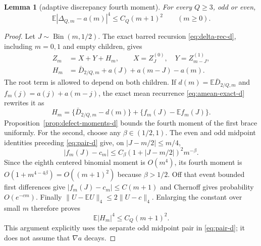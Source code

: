 \documentclass[11pt]{article}
\numberwithin{equation}{section}
\newtheorem{lemma}[theorem]{Lemma}
\newcommand{\1}{\mathbf 1}\newcommand{\F}{\mathcal F}\newcommand{\D}{\mathcal D}
\begin{document}
\begin{lemma}[adaptive discrepancy fourth moment]\label{lem:i5-fourth}
For every $Q\ge3$, odd or even,
\begin{equation}
 \mathbb E|\Delta_{Q,m}-a(m)|^4\le C_Q(m+1)^2\qquad(m\ge0).       \tag{5.2}\label{eq:i5-delta-fourth}
\end{equation}
\end{lemma}
\begin{proof}
Let $J\sim\operatorname {Bin}(m,1/2)$.  The exact barred recursion
\eqref{eq:delta-rec-d}, including $m=0,1$ and empty children, gives
\begin{align}
 Z_m&=X+Y+H_m,\qquad X=Z_J^{(0)},\quad Y=Z_{m-J}^{(1)},             \tag{5.3}\label{eq:i5-centered-rec}\\
 H_m&=\bar D_{2/Q,m}+a(J)+a(m-J)-a(m).                              \tag{5.4}\label{eq:i5-H}
\end{align}
The root term is allowed to depend on both children.  If
$d(m)=\mathbb E\bar D_{2/Q,m}$ and $f_m(j)=a(j)+a(m-j)$, the exact mean
recurrence \eqref{eq:amean-exact-d} rewrites it as
\[
 H_m=\{\bar D_{2/Q,m}-d(m)\}+\{f_m(J)-\mathbb Ef_m(J)\}.           \tag{5.5}\label{eq:i5-Hcenter}
\]
Proposition~\ref{prop:defect-moments-d} bounds the fourth moment of the first
brace uniformly.  For the second, choose any $\beta\in(1/2,1)$.  The even
and odd midpoint identities preceding \eqref{eq:pair-d} give, on
$|J-m/2|\le m/4$,
\[
 |f_m(J)-c_m|\le C_\beta(1+|J-m/2|)^2m^{-\beta}.
\]
Since the eighth centered binomial moment is $O(m^4)$, its fourth moment is
$O(1+m^{4-4\beta})=O((m+1)^2)$ because $\beta>1/2$.  Off that event bounded first differences give
$|f_m(J)-c_m|\le C(m+1)$ and Chernoff gives probability $O(e^{-cm})$.
Finally $\|U-\mathbb EU\|_4\le2\|U-c\|_4$.  Enlarging the constant over
small $m$ therefore proves
\begin{equation}\mathbb E|H_m|^4\le C_Q(m+1)^2.                    \tag{5.6}\label{eq:i5-H4}\end{equation}
This argument explicitly uses the separate odd midpoint pair in
\eqref{eq:pair-d}; it does not assume that $\nabla a$ decays.


\end{proof}
\end{document}
